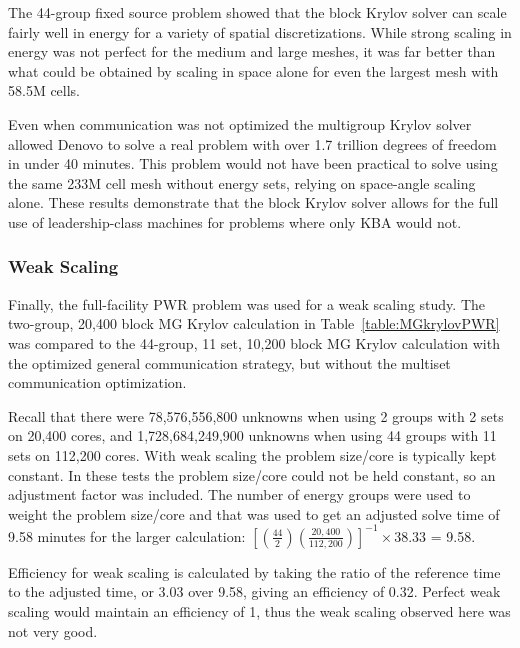 The 44-group fixed source problem showed that the block Krylov solver can scale fairly well in energy for a variety of spatial discretizations.  While strong scaling in energy was not perfect for the medium and large meshes, it was far better than what could be obtained by scaling in space alone for even the largest mesh with 58.5M cells. 

Even when communication was not optimized the multigroup Krylov solver allowed Denovo to solve a real problem with over 1.7 trillion degrees of freedom in under 40 minutes. This problem would not have been practical to solve using the same 233M cell mesh without energy sets, relying on space-angle scaling alone. These results demonstrate that the block Krylov solver allows for the full use of leadership-class machines for problems where only KBA would not.

\subsubsection{Weak Scaling}
Finally, the full-facility PWR problem was used for a weak scaling study. The two-group, 20,400 block MG Krylov calculation in Table~\ref{table:MGkrylovPWR} was compared to the 44-group, 11 set, 10,200 block MG Krylov calculation with the optimized general communication strategy, but without the multiset communication optimization. 

Recall that there were 78,576,556,800 unknowns when using 2 groups with 2 sets on 20,400 cores, and 1,728,684,249,900 unknowns when using 44 groups with 11 sets on 112,200 cores. With weak scaling the problem size/core is typically kept constant. In these tests the problem size/core could not be held constant, so an adjustment factor was included. The number of energy groups were used to weight the problem size/core and that was used to get an adjusted solve time of 9.58 minutes for the larger calculation: $[(\frac{44}{2})(\frac{20,400}{112,200})]^{-1}\times38.33$ = 9.58. 

Efficiency for weak scaling is calculated by taking the ratio of the reference time to the adjusted time, or 3.03 over 9.58, giving an efficiency of 0.32. %
Perfect weak scaling would maintain an efficiency of 1, thus the weak scaling observed here was not very good. 

